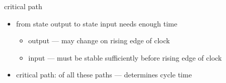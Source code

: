 \begin{frame}{critical path}
    \begin{itemize}
        \item {} from state output to state input needs enough time
            \begin{itemize}
            \item output --- may change on rising edge of clock
            \item input --- must be stable sufficiently before rising edge of clock
            \end{itemize}
        \item critical path:  of all these paths --- determines cycle time
    \end{itemize}
\end{frame}

